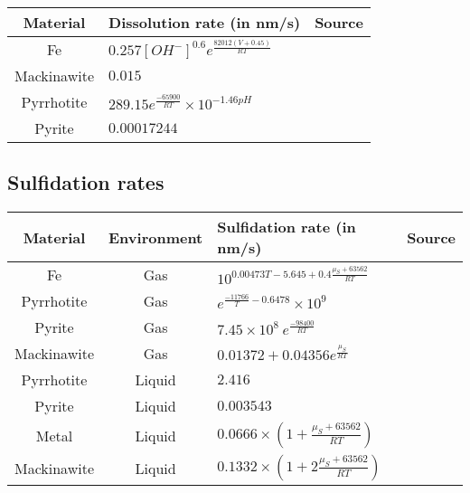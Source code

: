 \documentclass{article}
\begin{document}
\begin{center}
    \begin{tabular}{ | c | p{8cm} | c |}
    \hline
    Material & Dissolution rate (in nm/s) & Source \\

    \hline
    Fe & $0.257 [OH^-]^{0.6} e^{\frac{82012(V+0.45)}{R T}}$ & \cite{EKASRC72} \\

    \hline
    Mackinawite & $0.015$ & \cite{CMESLS08} \\

    \hline
    Pyrrhotite & $289.15 e^{\frac{-65900}{R T}} \times 10^{-1.46 pH}$ & \cite{PDAMPC14} \\

    \hline
    Pyrite & $0.00017244$ & \cite{ISACMP08} \\

    \hline

    \end{tabular}
\end{center}






\subsection{Sulfidation rates}


\begin{center}
    \begin{tabular}{ | c | c | p{8cm} | c |}
    \hline
    Material & Environment & Sulfidation rate (in nm/s) & Source \\

    \hline
    Fe & Gas & $ 10^{0.00473 T - 5.645 + 0.4 \frac{\mu_S+63562}{R T}}   $ & \cite{ACPPRJ04} \\

    \hline
    Pyrrhotite & Gas & $e^{\frac{-11766}{T} - 0.6478} \times 10^{9}$ & \cite{MGISFH15} \\

    \hline
    Pyrite & Gas & $7.45 \times 10^8 \ e^{\frac{-98400}{R T}}$ & \cite{KOGSRP03} \\

    \hline
    Mackinawite & Gas & $0.01372 + 0.04356 e^{\frac{\mu_S}{R T}}$ & \cite{COAETR90} \\

    \hline
    Pyrrhotite & Liquid & $2.416$ & \cite{COAETR90} \\

    \hline
    Pyrite & Liquid & $0.003543$ & \cite{CGOCNH98} \\

    \hline
    Metal & Liquid & $0.0666 \times \left(1 + \frac{\mu_S+63562}{R T}\right)$ & \cite{KOHCWS06} \\

    \hline
    Mackinawite & Liquid & $0.1332 \times \left(1 + 2 \frac{\mu_S+63562}{R T}\right)$ & \cite{MMMSWS07} \\

    \hline

    \end{tabular}
\end{center}
\end{document}
